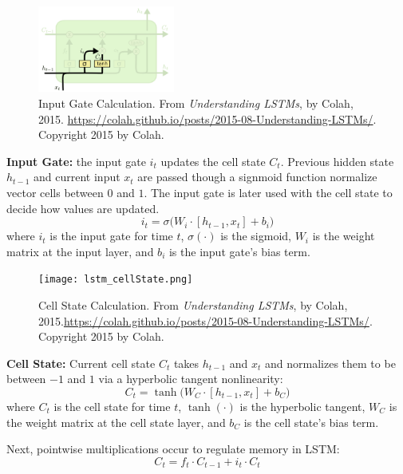 \begin{program}
\begin{figure}
\vspace{5pt}
\centering
\includegraphics[width=0.4\textwidth]{imgs/lstm_inputGate.png}
\vspace{-20pt}
\caption{\footnotesize Input Gate Calculation. From \emph{Understanding LSTMs}, by Colah, 2015. \url{https://colah.github.io/posts/2015-08-Understanding-LSTMs/}. Copyright 2015 by Colah.} 
\vspace{5pt}
\end{figure}
\textbf{Input Gate: } the input gate $i_t$ updates the cell state $C_t$. Previous hidden state $h_{t-1}$ and current input $x_t$ are passed though a signmoid function normalize vector cells between $0$ and $1$. The input gate is later used with the cell state to decide how values are updated. 
$$
i_t = \sigma \Big( W_i \cdot [h_{t-1}, x_t] + b_i \Big)
$$
where $i_t$ is the input gate for time $t$, $\sigma(\cdot)$ is the sigmoid, $W_i$ is the weight matrix at the input layer, and $b_i$ is the input gate's bias term. 
\end{program}





\begin{program}
\begin{figure}
\vspace{5pt}
\centering
\texttt{[image: lstm\_cellState.png]}
\vspace{-20pt}
\caption{\footnotesize Cell State Calculation. From \emph{Understanding LSTMs}, by Colah, 2015.\url{https://colah.github.io/posts/2015-08-Understanding-LSTMs/}. Copyright 2015 by Colah.}
\vspace{5pt}
\end{figure}

\textbf{Cell State: } Current cell state $C_t$ takes $h_{t-1}$ and $x_t$ and normalizes them to be between $-1$ and $1$ via a hyperbolic tangent nonlinearity:
$$
C_t = \tanh \Big( W_C \cdot [h_{t-1}, x_t] + b_C \Big)
$$
where $C_t$ is the cell state for time $t$, $\tanh(\cdot)$ is the hyperbolic tangent, $W_C$ is the weight matrix at the cell state layer, and $b_C$ is the cell state's bias term. 

Next, pointwise multiplications occur to regulate memory in LSTM: 
$$
C_t = f_t \cdot C_{t-1} + i_t \cdot C_t
$$
\end{program}



